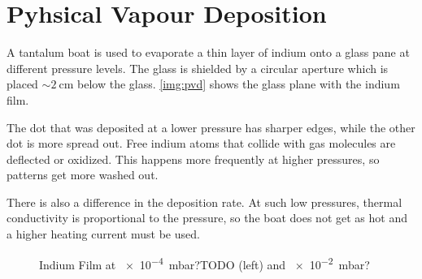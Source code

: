 \chapter{Pyhsical Vapour Deposition}

A tantalum boat is used to evaporate a thin layer of indium onto a glass pane at different pressure levels.
The glass is shielded by a circular aperture which is placed $\sim\SI{2}{\cm}$ below the glass.
\autoref{img:pvd} shows the glass plane with the indium film.

The dot that was deposited at a lower pressure has sharper edges, while the other dot is more spread out.
Free indium atoms that collide with gas molecules are deflected or oxidized.
This happens more frequently at higher pressures, so patterns get more washed out.

There is also a difference in the deposition rate.
At such low pressures, thermal conductivity is proportional to the pressure, so the boat does not get as hot and a higher heating current must be used.

\begin{figure}[b!]
	\centering
	\caption[Indium Film]{Indium Film at \SI{e-4}{\milli\bar}?TODO (left) and \SI{e-2}{\milli\bar}?}
	\label{img:pvd}
\end{figure}

